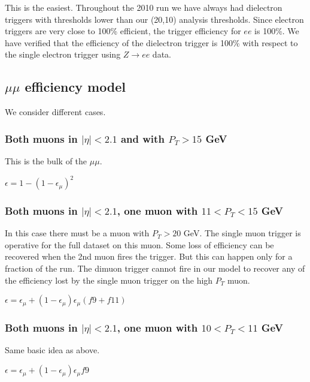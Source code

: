 This is the easiest.  Throughout the 2010 run we have always 
had dielectron triggers with thresholds lower than our (20,10)
analysis thresholds.  Since electron triggers are very close
to 100\% efficient\cite{ref:evans},
the trigger efficiency for $ee$ is 100\%.  We have verified that 
the efficiency of the dielectron trigger is 100\% with respect 
to the single electron trigger using $Z \to ee$ data.

\subsection{$\mu\mu$ efficiency model}
\label{sec:mmmodel} 

We consider different cases.

\subsubsection{Both muons in $|\eta|<2.1$ and with $P_T>15$ GeV}
This is the bulk of the $\mu\mu$.

\begin{center}
$\epsilon = 1 - (1-\epsilon_{\mu})^2$
\end{center}

\subsubsection{Both muons in $|\eta|<2.1$, one muon with $11<P_T<15$ GeV}
In this case there must be a muon with $P_T>20$ GeV.  The single muon
trigger is operative for the full dataset on this muon.  Some loss
of efficiency can be recovered when the 2nd muon fires the trigger.
But this can happen only for a fraction of the run.  The dimuon trigger
cannot fire in our model to recover any of the efficiency lost by 
the single muon trigger on the high $P_T$ muon.

\begin{center}
$\epsilon = \epsilon_{\mu} + (1-\epsilon_{\mu})\epsilon_{\mu}(f9+f11)$
\end{center}

\subsubsection{Both muons in $|\eta|<2.1$, one muon with $10<P_T<11$ GeV}
Same basic idea as above.

\begin{center}
$\epsilon = \epsilon_{\mu} + (1-\epsilon_{\mu})\epsilon_{\mu}f9$
\end{center}

